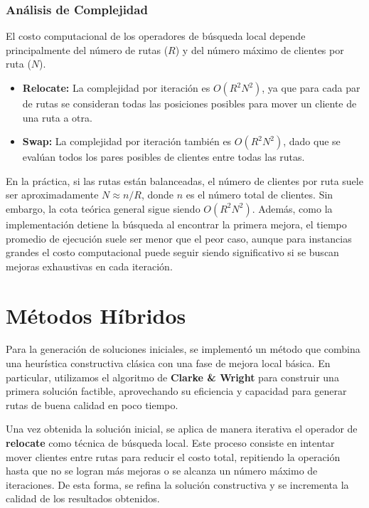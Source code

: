 \documentclass[a4paper,12pt]{article}
\begin{document}
\subsubsection{Análisis de Complejidad}
El costo computacional de los operadores de búsqueda local depende principalmente del número de rutas ($R$) y del número máximo de clientes por ruta ($N$). 

\begin{itemize}
    \item \textbf{Relocate:} La complejidad por iteración es $O(R^2 N^2)$, ya que para cada par de rutas se consideran todas las posiciones posibles para mover un cliente de una ruta a otra.
    \item \textbf{Swap:} La complejidad por iteración también es $O(R^2 N^2)$, dado que se evalúan todos los pares posibles de clientes entre todas las rutas.
\end{itemize}

En la práctica, si las rutas están balanceadas, el número de clientes por ruta suele ser aproximadamente $N \approx n/R$, donde $n$ es el número total de clientes. Sin embargo, la cota teórica general sigue siendo $O(R^2 N^2)$. Además, como la implementación detiene la búsqueda al encontrar la primera mejora, el tiempo promedio de ejecución suele ser menor que el peor caso, aunque para instancias grandes el costo computacional puede seguir siendo significativo si se buscan mejoras exhaustivas en cada iteración.

\section{Métodos Híbridos}

Para la generación de soluciones iniciales, se implementó un método que combina una heurística constructiva clásica con una fase de mejora local básica. En particular, utilizamos el algoritmo de \textbf{Clarke \& Wright} para construir una primera solución factible, aprovechando su eficiencia y capacidad para generar rutas de buena calidad en poco tiempo.

Una vez obtenida la solución inicial, se aplica de manera iterativa el operador de  \textbf{relocate} como técnica de búsqueda local. Este proceso consiste en intentar mover clientes entre rutas para reducir el costo total, repitiendo la operación hasta que no se logran más mejoras o se alcanza un número máximo de iteraciones. De esta forma, se refina la solución constructiva y se incrementa la calidad de los resultados obtenidos.
\end{document}
